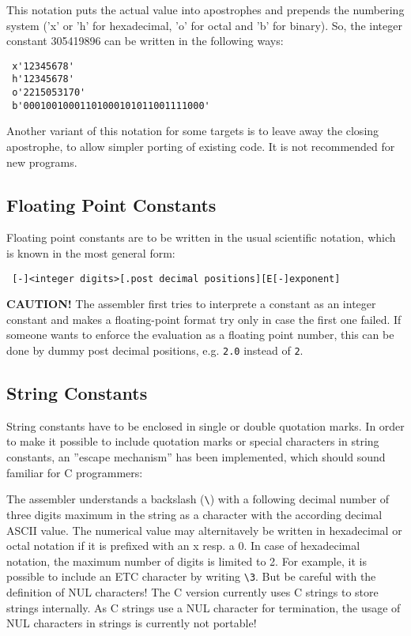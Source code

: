 \documentclass[12pt,twoside]{report}
\newcommand{\bb}[1]{{\bf #1}}
\newcommand{\tty}[1]{{\tt #1}}
\begin{document}
This notation puts the actual value into apostrophes and prepends
the numbering system ('x' or 'h' for hexadecimal, 'o' for octal and 'b'
for binary).  So, the integer constant 305419896 can be written in the
following ways:
\begin{verbatim}
 x'12345678'
 h'12345678'
 o'2215053170'
 b'00010010001101000101011001111000'
\end{verbatim}
Another variant of this notation for some targets is to leave away the
closing apostrophe, to allow simpler porting of existing code.  It is
not recommended for new programs.

\subsection{Floating Point Constants}

Floating point constants are to be written in the usual scientific
notation, which is known in the most general form:
\begin{verbatim}
 [-]<integer digits>[.post decimal positions][E[-]exponent]
\end{verbatim}
\bb{CAUTION!} The assembler first tries to interprete a constant as an
integer constant and makes a floating-point format try only in case
the first one failed.  If someone wants to enforce the evaluation as
a floating point number, this can be done by dummy post decimal
positions, e.g.  \tty{2.0} instead of \tty{2}.

\subsection{String Constants}
\label{SectStringConsts}

String constants have to be enclosed in single or double quotation marks.
In order to make it possible to include quotation marks or special characters
in string constants, an ''escape mechanism'' has been implemented, which
should sound familiar for C programmers:

The assembler understands a backslash (\verb!\!) with a following decimal
number of three digits maximum in the string as a character with the
according decimal ASCII value.  The numerical value may alternitavely be
written in hexadecimal or octal notation if it is prefixed with an x resp.
a 0.  In case of hexadecimal notation, the maximum number of digits is
limited to 2.  For example, it is possible to include an ETC character by
writing {\tt\verb!\!3}.  But be careful with the definition of NUL
characters!  The C  version currently uses C strings
to store strings internally.  As C strings use a NUL character for
termination, the usage of NUL characters in strings is currently not
portable!
\end{document}
